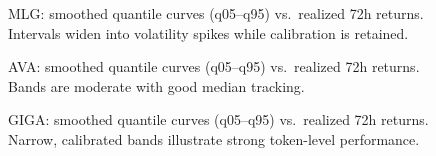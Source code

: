 \documentclass[
  a4paper,
  DIV=11,
  numbers=noendperiod]{scrreprt}
\begin{document}
\begin{figure}


\caption{\label{fig-fan-mlg}MLG: smoothed quantile curves (q05--q95)
vs.~realized 72h returns. Intervals widen into volatility spikes while
calibration is retained.}

\end{figure}%

\begin{figure}


\caption{\label{fig-fan-ava}AVA: smoothed quantile curves (q05--q95)
vs.~realized 72h returns. Bands are moderate with good median tracking.}

\end{figure}%

\begin{figure}


\caption{\label{fig-fan-giga}GIGA: smoothed quantile curves (q05--q95)
vs.~realized 72h returns. Narrow, calibrated bands illustrate strong
token-level performance.}

\end{figure}%
\end{document}
